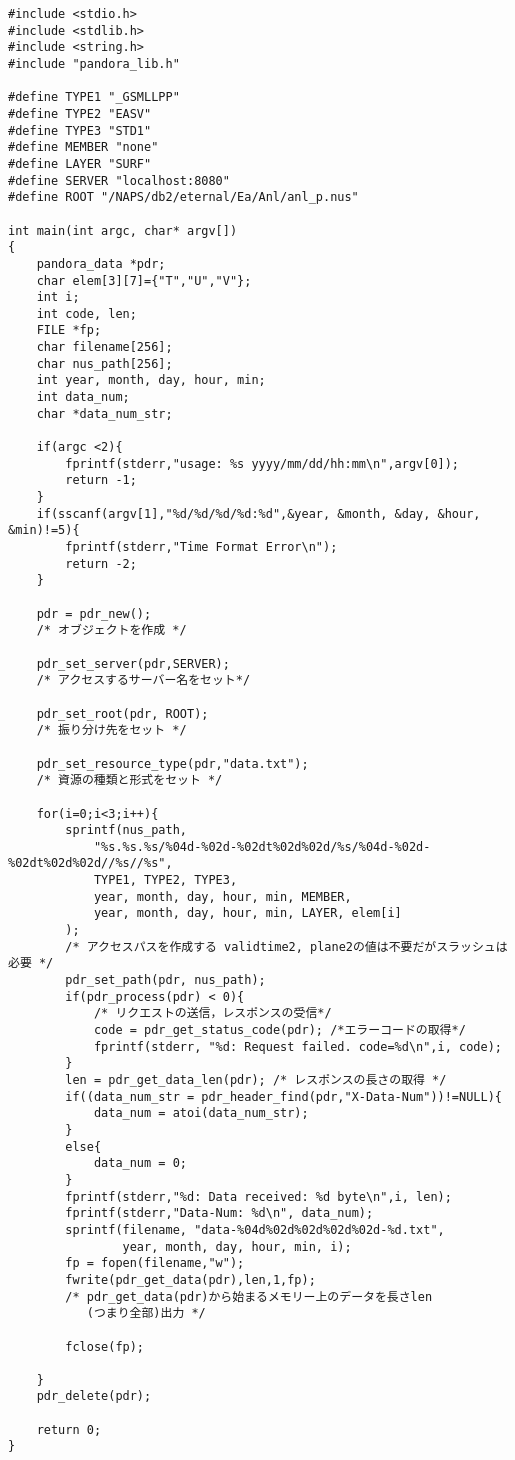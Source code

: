 \begin{verbatim}
#include <stdio.h>
#include <stdlib.h>
#include <string.h>
#include "pandora_lib.h"

#define TYPE1 "_GSMLLPP"
#define TYPE2 "EASV"
#define TYPE3 "STD1"
#define MEMBER "none"
#define LAYER "SURF"
#define SERVER "localhost:8080"
#define ROOT "/NAPS/db2/eternal/Ea/Anl/anl_p.nus"

int main(int argc, char* argv[])
{
    pandora_data *pdr;
    char elem[3][7]={"T","U","V"};
    int i;
    int code, len;
    FILE *fp;
    char filename[256];
    char nus_path[256];
    int year, month, day, hour, min;
    int data_num;
    char *data_num_str;
    
    if(argc <2){
        fprintf(stderr,"usage: %s yyyy/mm/dd/hh:mm\n",argv[0]);
        return -1;
    }
    if(sscanf(argv[1],"%d/%d/%d/%d:%d",&year, &month, &day, &hour, &min)!=5){
        fprintf(stderr,"Time Format Error\n");
        return -2;
    }
    
    pdr = pdr_new();
    /* オブジェクトを作成 */
    
    pdr_set_server(pdr,SERVER);
    /* アクセスするサーバー名をセット*/
    
    pdr_set_root(pdr, ROOT);
    /* 振り分け先をセット */
    
    pdr_set_resource_type(pdr,"data.txt");
    /* 資源の種類と形式をセット */
    
    for(i=0;i<3;i++){
        sprintf(nus_path,
            "%s.%s.%s/%04d-%02d-%02dt%02d%02d/%s/%04d-%02d-%02dt%02d%02d//%s//%s",
            TYPE1, TYPE2, TYPE3,
            year, month, day, hour, min, MEMBER,
            year, month, day, hour, min, LAYER, elem[i]
        );
        /* アクセスパスを作成する validtime2, plane2の値は不要だがスラッシュは必要 */
        pdr_set_path(pdr, nus_path);
        if(pdr_process(pdr) < 0){ 
            /* リクエストの送信，レスポンスの受信*/
            code = pdr_get_status_code(pdr); /*エラーコードの取得*/
            fprintf(stderr, "%d: Request failed. code=%d\n",i, code);
        }
        len = pdr_get_data_len(pdr); /* レスポンスの長さの取得 */
        if((data_num_str = pdr_header_find(pdr,"X-Data-Num"))!=NULL){
            data_num = atoi(data_num_str);
        }
        else{
            data_num = 0;
        }
        fprintf(stderr,"%d: Data received: %d byte\n",i, len);
        fprintf(stderr,"Data-Num: %d\n", data_num);
        sprintf(filename, "data-%04d%02d%02d%02d%02d-%d.txt", 
                year, month, day, hour, min, i);
        fp = fopen(filename,"w");
        fwrite(pdr_get_data(pdr),len,1,fp);
        /* pdr_get_data(pdr)から始まるメモリー上のデータを長さlen
           (つまり全部)出力 */
        
        fclose(fp);
        
    }
    pdr_delete(pdr);
    
    return 0;
}
\end{verbatim}


